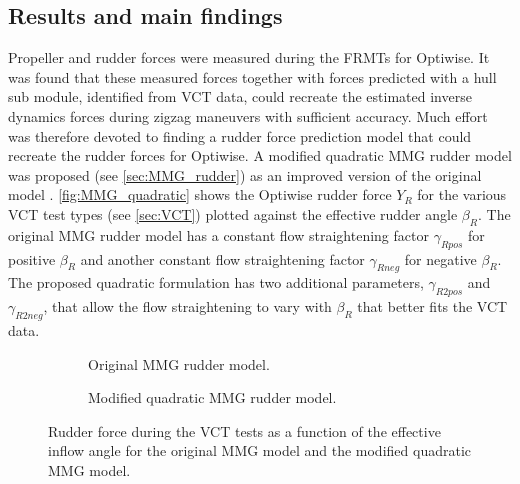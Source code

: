 \subsection*{Results and main findings}
Propeller and rudder forces were measured during the FRMTs for Optiwise. It was found that these measured forces together with forces predicted with a hull sub module, identified from VCT data, could recreate the estimated inverse dynamics forces during zigzag maneuvers with sufficient accuracy. Much effort was therefore devoted to finding a rudder force prediction model that could recreate the rudder forces for Optiwise. A modified quadratic MMG rudder model was proposed (see \autoref{sec:MMG_rudder}) as an improved version of the original model \cite{yasukawaIntroductionMMGStandard2015}. 
\autoref{fig:MMG_quadratic} shows the Optiwise rudder force $Y_R$ for the various VCT test types (see \autoref{sec:VCT}) plotted against the effective rudder angle $\beta_R$. The original MMG rudder model has a constant flow straightening factor $\gamma_{Rpos}$ for positive $\beta_R$ and another constant flow straightening factor $\gamma_{Rneg}$ for negative $\beta_R$. The proposed quadratic formulation has two additional parameters, $\gamma_{R2pos}$ and $\gamma_{R2neg}$, that allow the flow straightening to vary with $\beta_R$ that better fits the VCT data.
\begin{figure}[h]
     \centering
     \begin{subfigure}[b]{0.49\textwidth}
         \centering
         
        \caption{Original MMG rudder model.}
        \label{fig:Y_R_MMG_original}
     \end{subfigure}
     \hfill
     \begin{subfigure}[b]{0.49\textwidth}
         \centering
         
        \caption{Modified quadratic MMG rudder model.}
        \label{fig:Y_R_MMG_quadratic}
     \end{subfigure}
    \caption{Rudder force during the VCT tests as a function of the effective inflow angle for the original MMG model and the modified quadratic MMG model.}
    \label{fig:MMG_quadratic}
\end{figure}

